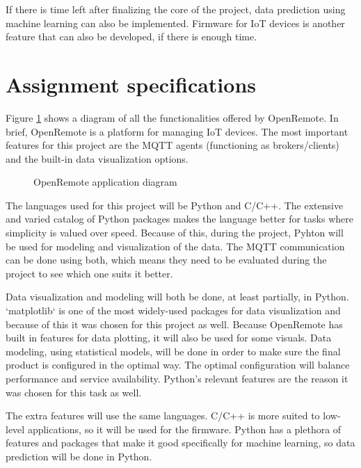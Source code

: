 \documentclass{report}
\begin{document}
	If there is time left after finalizing the core of the project, data prediction using machine learning can also be implemented. Firmware for IoT devices is another feature that can also be developed, if there is enough time.
	
	\section{Assignment specifications}\label{specifications}
	Figure \ref{openremote_diagram} shows a diagram of all the functionalities offered by OpenRemote. In brief, OpenRemote is a platform for managing IoT devices. The most important features for this project are the MQTT agents (functioning as brokers/clients) and the built-in data visualization options. 
	
	\begin{figure}[ht]
		\centering
		\caption{OpenRemote application diagram \cite{openremote_intro}}
		\label{openremote_diagram}
	\end{figure}
	
	The languages used for this project will be Python and C/C++. The extensive and varied catalog of Python packages makes the language better for tasks where simplicity is valued over speed. Because of this, during the project, Pyhton will be used for modeling and visualization of the data. The MQTT communication can be done using both, which means they need to be evaluated during the project to see which one suits it better.
	
	Data visualization and modeling will both be done, at least partially, in Python. `matplotlib` is one of the most widely-used packages for data visualization and because of this it was chosen for this project as well. Because OpenRemote has built in features for data plotting, it will also be used for some visuals. Data modeling, using statistical models, will be done in order to make sure the final product is configured in the optimal way. The optimal configuration will balance performance and service availability. Python's relevant features are the reason it was chosen for this task as well. 
	
	The extra features will use the same languages. C/C++ is more suited to low-level applications, so it will be used for the firmware. Python has a plethora of features and packages that make it good specifically for machine learning, so data prediction will be done in Python.
	
	
\end{document}
